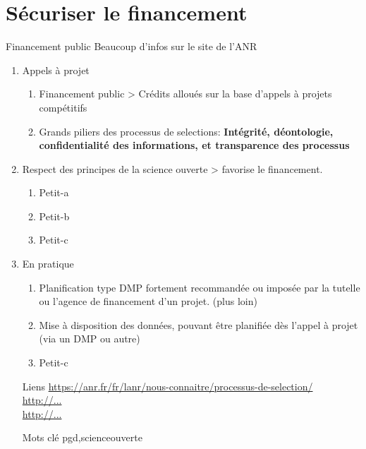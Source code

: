 \documentclass{book}
\begin{document}
\section{Sécuriser le financement}

Financement public 
Beaucoup d'infos sur le site de l'ANR

\begin{enumerate}
	\item Appels à projet
        \begin{enumerate}
            \item Financement public > Crédits alloués sur la base d'appels à projets compétitifs
            \item Grands piliers des processus de selections: \textbf{Intégrité, déontologie, confidentialité des informations, et transparence des processus}
        \end{enumerate}
	\item Respect des principes de la science ouverte > favorise le financement.
        \begin{enumerate}
            \item Petit-a
            \item Petit-b
            \item Petit-c
        \end{enumerate}
	\item En pratique
        \begin{enumerate}
            \item Planification type DMP fortement recommandée ou imposée par la tutelle ou l'agence de financement d'un projet. (plus loin)
            \item Mise à disposition des données, pouvant être planifiée dès l'appel à projet (via un DMP ou autre)
            \item Petit-c
        \end{enumerate}
\end{enumerate}

\begin{itemize}
    \item [Liens]
        \url{https://anr.fr/fr/lanr/nous-connaitre/processus-de-selection/}\\
        \url{http://...}\\
        \url{http://...}\\
    \item [Mots clé]
        \gls{pgd},\gls{scienceouverte}
\end{itemize}
\end{document}
